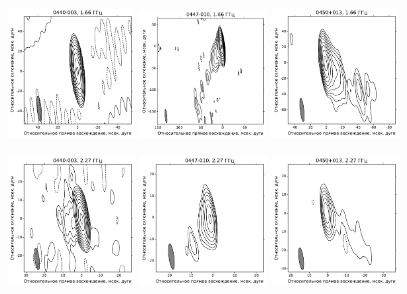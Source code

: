 \addtocounter{figure}{-1}
\begin{figure}
  \centering

  \includegraphics[width=0.3\textwidth]{0440-003_L.pdf}
  \includegraphics[width=0.3\textwidth]{0447-010_L.pdf}
  \includegraphics[width=0.3\textwidth]{0450+013_L.pdf}


  \includegraphics[width=0.3\textwidth]{0440-003_S.pdf}
  \includegraphics[width=0.3\textwidth]{0447-010_S.pdf}
  \includegraphics[width=0.3\textwidth]{0450+013_S.pdf}



\end{figure}
